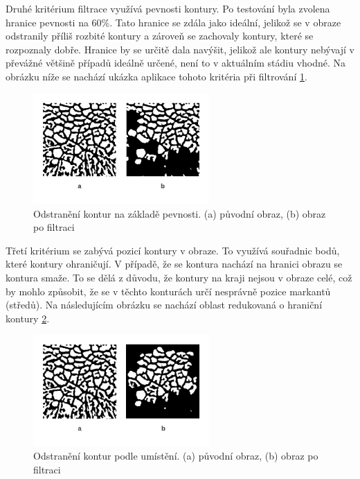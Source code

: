 Druhé kritérium filtrace využívá pevnosti kontury. Po testování byla zvolena hranice pevnosti na 60\%. Tato hranice se zdála jako ideální, jelikož se v obraze odstranily příliš rozbité kontury a zároveň se zachovaly kontury, které se rozpoznaly dobře. Hranice by se určitě dala navýšit, jelikož ale kontury nebývají v převážné většině případů ideálně určené, není to v aktuálním stádiu vhodné. Na obrázku níže se nachází ukázka aplikace tohoto kritéria při filtrování \ref{filter2}. 

\newpage
\begin{figure}[h]
	\centering
	\includegraphics[width=0.6\textwidth]{obrazky/filter2.png}
	\caption{Odstranění kontur na základě pevnosti. (a) původní obraz, (b) obraz po filtraci}
	\label{filter2}
\end{figure} 

Třetí kritérium se zabývá pozicí kontury v obraze. To využívá souřadnic bodů, které kontury ohraničují. V případě, že se kontura nachází na hranici obrazu se kontura smaže. To se dělá z důvodu, že kontury na kraji nejsou v obraze celé, což by mohlo způsobit, že se v těchto konturách určí nesprávně pozice markantů (středů). Na následujícím obrázku se nachází oblast redukovaná o hraniční kontury \ref{filter3}.

\begin{figure}[h]
	\centering
	\includegraphics[width=0.6\textwidth]{obrazky/filter3.png}
	\caption{Odstranění kontur podle umístění. (a) původní obraz, (b) obraz po filtraci}
	\label{filter3}
\end{figure} 

